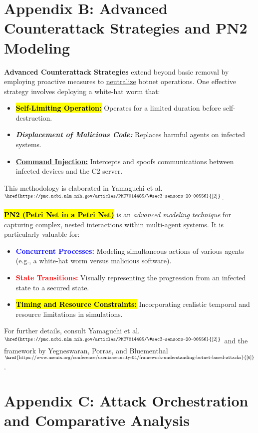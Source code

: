 \documentclass{article}
\begin{document}
\section*{Appendix B: Advanced Counterattack Strategies and PN2 Modeling}
\noindent \textbf{Advanced Counterattack Strategies} extend beyond basic removal by employing proactive measures to \underline{neutralize} botnet operations. One effective strategy involves deploying a white-hat worm that:
\begin{itemize}
    \item \textbf{\hl{Self-Limiting Operation:}} Operates for a limited duration before self-destruction.
    \item \textbf{\textit{Displacement of Malicious Code:}} Replaces harmful agents on infected systems.
    \item \textbf{\underline{Command Injection:}} Intercepts and spoofs communications between infected devices and the C2 server.
\end{itemize}
This methodology is elaborated in Yamaguchi et al.$^{\text{\href{https://pmc.ncbi.nlm.nih.gov/articles/PMC7014485/\#sec3-sensors-20-00556}{[2]}}}$.

\vspace{3mm}
\noindent \textbf{\hl{PN2 (Petri Net in a Petri Net)}} is an \textit{\underline{advanced modeling technique}} for capturing complex, nested interactions within multi-agent systems. It is particularly valuable for:
\begin{itemize}
    \item \textbf{\textcolor{blue}{Concurrent Processes:}} Modeling simultaneous actions of various agents (e.g., a white-hat worm versus malicious software).
    \item \textbf{\textcolor{red}{State Transitions:}} Visually representing the progression from an infected state to a secured state.
    \item \textbf{\hl{Timing and Resource Constraints:}} Incorporating realistic temporal and resource limitations in simulations.
\end{itemize}
For further details, consult Yamaguchi et al.$^{\text{\href{https://pmc.ncbi.nlm.nih.gov/articles/PMC7014485/\#sec3-sensors-20-00556}{[2]}}}$ and the framework by Yegneswaran, Porras, and Bluementhal$^{\text{\href{https://www.usenix.org/conference/usenix-security-04/framework-understanding-botnet-based-attacks}{[6]}}}$.

\section*{Appendix C: Attack Orchestration and Comparative Analysis}
\end{document}
